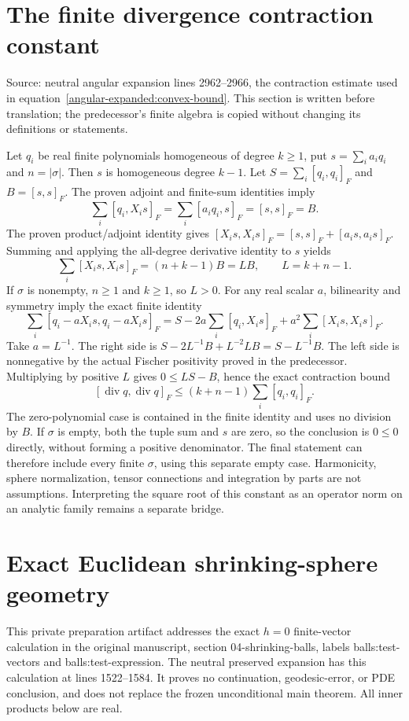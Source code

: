 \documentclass[11pt]{article}
\theoremstyle{definition}
\theoremstyle{remark}
\numberwithin{equation}{section}
\begin{document}
\section{The finite divergence contraction constant}
\label{fischer:divergence}
Source: neutral angular expansion lines 2962--2966, the contraction estimate
used in equation~\eqref{angular-expanded:convex-bound}. This section is written before
translation; the predecessor's finite algebra is copied without changing its
definitions or statements.

Let $q_i$ be real finite polynomials homogeneous of degree $k\geq1$, put
$s=\sum_i a_iq_i$ and $n=|\sigma|$. Then $s$ is homogeneous degree $k-1$.
Let $S=\sum_i[q_i,q_i]_F$ and $B=[s,s]_F$. The proven adjoint and finite-sum
identities imply
\[
 \sum_i[q_i,X_i s]_F=\sum_i[a_iq_i,s]_F=[s,s]_F=B.
\]
The proven product/adjoint identity gives
$[X_i s,X_i s]_F=[s,s]_F+[a_i s,a_i s]_F$.
Summing and applying the all-degree derivative identity to $s$ yields
\[
 \sum_i[X_i s,X_i s]_F=(n+k-1)B=LB,
 \qquad L=k+n-1.
\]
If $\sigma$ is nonempty, $n\geq1$ and $k\geq1$, so $L>0$. For any real
scalar $a$, bilinearity and symmetry imply the exact finite identity
\[
 \sum_i[q_i-aX_i s,q_i-aX_i s]_F
 =S-2a\sum_i[q_i,X_i s]_F+a^2\sum_i[X_i s,X_i s]_F.
\]
Take $a=L^{-1}$. The right side is
$S-2L^{-1}B+L^{-2}LB=S-L^{-1}B$.
The left side is nonnegative by the actual Fischer positivity proved in the
predecessor. Multiplying by positive $L$ gives $0\leq LS-B$, hence the exact
contraction bound
\[
 [\operatorname{div}q,\operatorname{div}q]_F
 \leq(k+n-1)\sum_i[q_i,q_i]_F.
\]
The zero-polynomial case is contained in the finite identity and uses no
division by $B$. If $\sigma$ is empty, both the tuple sum and $s$ are zero,
so the conclusion is $0\leq0$ directly, without forming a positive denominator.
The final statement can therefore include every finite $\sigma$, using this
separate empty case. Harmonicity, sphere normalization, tensor connections and
integration by parts are not assumptions. Interpreting the square root of this
constant as an operator norm on an analytic family remains a separate bridge.

\clearpage
\section{Exact Euclidean shrinking-sphere geometry}\label{geometry:residual}


This private preparation artifact addresses the exact $h=0$ finite-vector
calculation in the original manuscript, section 04-shrinking-balls,
labels balls:test-vectors and balls:test-expression.  The neutral preserved
expansion has this calculation at lines 1522--1584.  It proves no
continuation, geodesic-error, or PDE conclusion, and does not replace the
frozen unconditional main theorem.  All inner products below are real.
\end{document}
